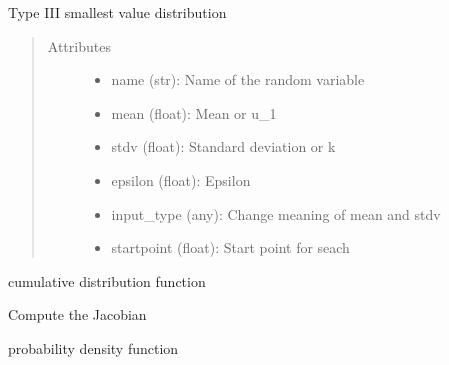 \documentclass[letterpaper,10pt,english]{sphinxmanual}
\begin{document}
\begin{fulllineitems}
Type III smallest value distribution
\begin{quote}\begin{description}
\item[{Attributes }] \leavevmode\begin{itemize}
\item {} 
name (str):   Name of the random variable

\item {} 
mean (float): Mean or u\_1

\item {} 
stdv (float): Standard deviation or k

\item {} 
epsilon (float): Epsilon

\item {} 
input\_type (any): Change meaning of mean and stdv

\item {} 
startpoint (float): Start point for seach

\end{itemize}

\end{description}\end{quote}


\begin{fulllineitems}
cumulative distribution function

\end{fulllineitems}



\begin{fulllineitems}
Compute the Jacobian

\end{fulllineitems}



\begin{fulllineitems}
probability density function


\end{fulllineitems}
\end{fulllineitems}
\end{document}
